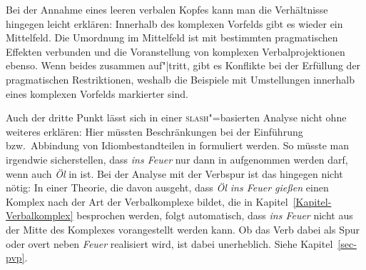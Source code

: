 Bei der Annahme eines leeren verbalen Kopfes kann man die Verhältnisse hingegen leicht erklären:
Innerhalb des komplexen Vorfelds gibt es wieder ein Mittelfeld.
Die Umordnung im Mittelfeld ist mit bestimmten pragmatischen Effekten verbunden und die Voranstellung
von komplexen Verbalprojektionen ebenso. Wenn beides zusammen auf"|tritt, gibt es Konflikte bei der
Erfüllung der pragmatischen Restriktionen, weshalb die Beispiele mit Umstellungen innerhalb eines
komplexen Vorfelds markierter sind.

Auch der dritte Punkt lässt sich in einer \textsc{slash}"=basierten Analyse nicht ohne weiteres erklären:
Hier müssten Beschränkungen bei der Einführung bzw.\ Abbindung von Idiombestandteilen
in \slasch formuliert werden. So müsste man \zb irgendwie sicherstellen, dass \emph{ins Feuer} nur
dann in \slasch aufgenommen werden darf, wenn auch \emph{Öl} in \slasch ist.
Bei der Analyse mit der Verbspur ist das hingegen nicht nötig: In einer Theorie, die davon ausgeht, dass
\emph{Öl ins Feuer gießen} einen Komplex nach der Art der Verbalkomplexe bildet, die in
Kapitel~\ref{Kapitel-Verbalkomplex} besprochen werden, folgt automatisch, dass \emph{ins Feuer} nicht
aus der Mitte des Komplexes vorangestellt werden kann. Ob das Verb dabei als Spur oder overt neben
\emph{Feuer} realisiert wird, ist dabei unerheblich. Siehe Kapitel~\ref{sec-pvp}.



